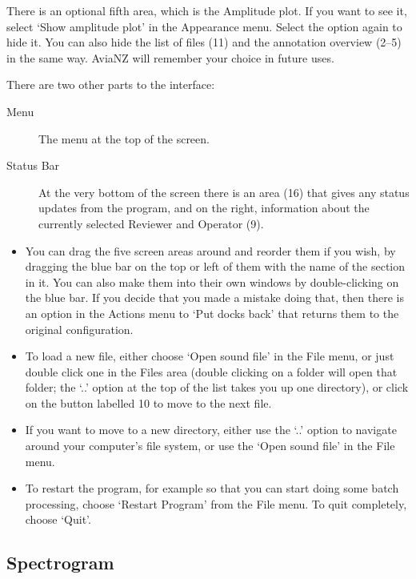 \documentclass{article}
\begin{document}
There is an optional fifth area, which is the Amplitude plot. If you want to see it, select `Show amplitude plot' in the Appearance menu. Select the option again to hide it. You can also hide the list of files (11) and the annotation overview (2--5) in the same way. AviaNZ will remember your choice in future uses.

There are two other parts to the interface:
	\begin{description}
	\item[Menu] The menu at the top of the screen. 
	\item[Status Bar] At the very bottom of the screen there is an area (16) that gives any status updates from the program, and on the right, information about the currently selected Reviewer and Operator (9).
	\end{description}

\begin{itemize}
\item You can drag the five screen areas around and reorder them if you wish, by dragging the blue bar on the top or left of them with the name of the section in it. You can also make them into their own windows by double-clicking on the blue bar. If you decide that you made a mistake doing that, then there is an option in the Actions menu to `Put docks back' that returns them to the original configuration.

\item To load a new file, either choose `Open sound file' in the File menu, or just double click one in the Files area (double clicking on a folder will open that folder; the `..' option at the top of the list takes you up one directory), or click on the button labelled 10 to move to the next file.

\item If you want to move to a new directory, either use the `..' option to navigate around your computer's file system, or use the  `Open sound file' in the File menu.

\item To restart the program, for example so that you can start doing some batch processing, choose `Restart Program' from the File menu. To quit completely, choose `Quit'. 
\end{itemize}

\subsection{Spectrogram}\label{sec:spectrogram}
\end{document}
